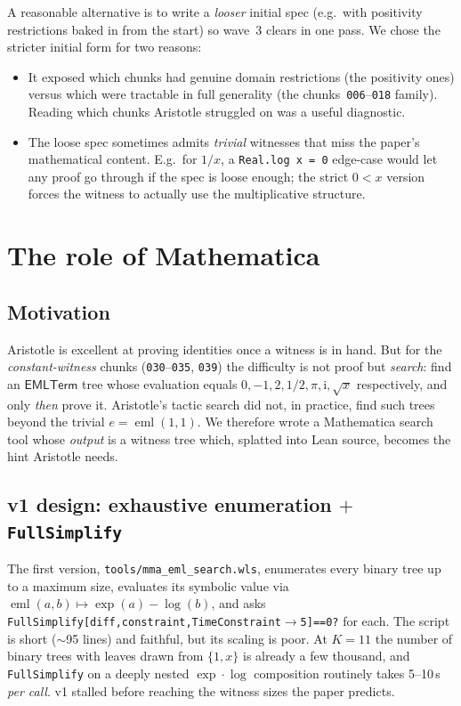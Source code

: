 \documentclass[11pt,a4paper]{article}
\theoremstyle{plain}
\theoremstyle{definition}
\newcommand{\eml}{\operatorname{eml}}
\newcommand{\imu}{\mathrm{i}}
\newcommand{\EMLT}{\mathsf{EMLTerm}}
\begin{document}
A reasonable alternative is to write a \emph{looser} initial spec
(e.g.~with positivity restrictions baked in from the start) so wave~3
clears in one pass.  We chose the stricter initial form for two reasons:

\begin{itemize}[leftmargin=*,nosep]
\item It exposed which chunks had genuine domain restrictions (the
positivity ones) versus which were tractable in full
generality (the chunks~\texttt{006}--\texttt{018} family).  Reading
which chunks Aristotle struggled on was a useful diagnostic.
\item The loose spec sometimes admits \emph{trivial} witnesses that
miss the paper's mathematical content.  E.g.~for $1/x$, a
\texttt{Real.log x = 0} edge-case would let any proof go through if
the spec is loose enough; the strict $0<x$ version forces the witness
to actually use the multiplicative structure.
\end{itemize}

\section{The role of Mathematica}\label{sec:mma}

\subsection{Motivation}

Aristotle is excellent at proving identities once a witness is in hand.
But for the \emph{constant-witness} chunks
(\texttt{030}--\texttt{035}, \texttt{039}) the difficulty is not proof
but \emph{search}: find an $\EMLT$ tree whose evaluation equals
$0,-1,2,1/2,\pi,\imu,\sqrt{x}$ respectively, and only \emph{then} prove it.
Aristotle's tactic search did not, in practice, find such trees beyond the
trivial $e=\eml(1,1)$.  We therefore wrote a Mathematica search tool
whose \emph{output} is a witness tree which, splatted into Lean source,
becomes the hint Aristotle needs.

\subsection{v1 design: exhaustive enumeration $+$ \texttt{FullSimplify}}

The first version, \texttt{tools/mma\_eml\_search.wls}, enumerates every
binary tree up to a maximum size, evaluates its symbolic value via
$\eml(a,b)\mapsto\exp(a)-\log(b)$, and asks
\texttt{FullSimplify[diff,constraint,TimeConstraint$\to$5]==0?} for each.
The script is short ($\sim$95 lines) and faithful, but its scaling is
poor.  At $K=11$ the number of binary trees with leaves drawn from
$\{1,x\}$ is already a few thousand, and \texttt{FullSimplify} on a
deeply nested $\exp{\cdot}\log$ composition routinely takes 5--10\,s
\emph{per call}.  v1 stalled before reaching the witness sizes the paper
predicts.
\end{document}
